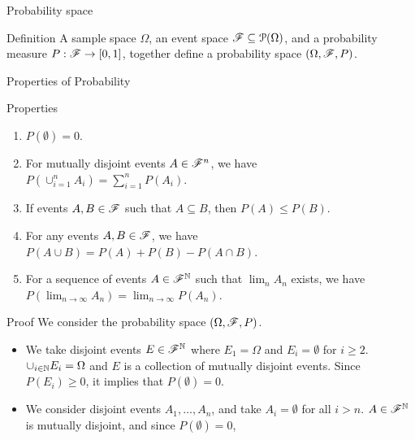 \documentclass[12pt,aspectratio=169]{beamer}
\begin{document}
\begin{frame}{Probability space}
    \begin{block}{Definition}
    A sample space $\Omega$, an event space $\mathscr{F}\subseteq \mathcal{P}(\Omega)$, 
    and a probability measure $P: \mathscr{F} \to [0,1]$, 
    together define a probability space $(\Omega,\mathscr{F},P)$.
    \end{block}
\end{frame}

\begin{frame}{Properties of Probability}
    
    \begin{block}{Properties} 
        \begin{enumerate}
            \item <1-> [\textbf{Impossibility:}] $P(\emptyset) = 0$.
            \item <2-> [\textbf{Finite Additivity:}] For mutually disjoint events $A\in \mathscr{F}^n$, 
            we have $P(\cup_{i=1}^nA_i) = \sum_{i=1}^nP(A_i)$. 
            \item <3-> [\textbf{Monotonicity:}] If events $A, B \in \mathscr{F}$ such that $A \subseteq B$, then $P(A) \le P(B)$. 
            \item <4-> [\textbf{Inclusion-Exclusion:}] For any events $A, B \in \mathscr{F}$, we have $P(A \cup B) = P(A) + P(B) - P(A \cap B)$.
            \item <5-> [\textbf{Continuity:}] For a sequence of events $A \in \mathscr{F}^{\mathbb{N}}$ such that $\lim_nA_n$ exists, we have $P(\lim_{n \to \infty}A_n) = \lim_{n \to \infty}P(A_n)$. 
        \end{enumerate}
    \end{block}
\end{frame}

\begin{frame}{Proof}
We consider the probability space $(\Omega, \mathscr{F}, P)$.
    \begin{itemize}
        \item <1-> We take disjoint events $E\in\mathscr{F}^{\mathbb{N}}$ where $E_1 = \Omega$ and $E_i = \emptyset$ for $i \ge 2$. 
        \implies $\cup_{i \in \mathbb{N}}E_i = \Omega$ and $E$ is a collection of mutually disjoint events.  
        Since $P(E_i) \ge 0$, it implies that $P(\emptyset) = 0$. 
        \item <2-> We consider disjoint events $A_1, \dots, A_n$, and take $A_{i} = \emptyset$ for all $i > n$. 
        \implies $A\in\mathscr{F}^{\mathbb{N}}$ is mutually disjoint, and since $P(\emptyset) = 0$,  
    \end{itemize}
\end{frame}
\end{document}
